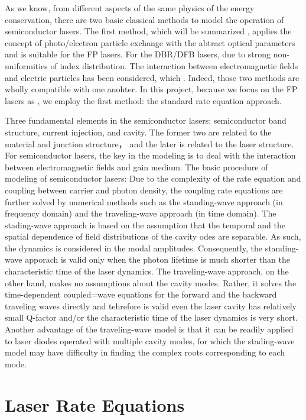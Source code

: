 As we know, from different aspects of the same physics of the energy
conservation, there are two basic classical methods to model the operation of
semiconductor lasers. The first method, which will be summarized , applies the
concept of photo/electron particle exchange with the abtract optical parameters
and is suitable for the FP lasers. For the DBR/DFB lasers, due to strong
non-uniformities of index distribution. The interaction between electromagnetic
fields and electric particles has been considered, which . Indeed, those two
methods are wholly compatible with one anohter. In this project, because we
focus on the FP lasers as , we employ the first method: the standard rate
equation approach.

Three fundamental elements in the semiconductor lasers: semiconductor band
structure, current injection, and cavity. The former two are related to the
material and junction structure， and the later is related to the laser
structure. For semiconductor lasers, the key in the modeling is to deal with
the interaction between electromagnetic fields and gain medium. The basic
procedure of modeling of semiconductor lasers: Due to the complexity of the
rate equation and coupling between carrier and photon density, the coupling
rate equations are further solved by numerical methods such as the
standing-wave approach (in frequency domain) and the traveling-wave approach
(in time domain). The stading-wave approach is based on the assumption that the
temporal and the spatial dependence of field distributions of the cavity odes
are separable. As such, the dynamics is considered in the modal amplitudes.
Consequently, the standing-wave apporach is valid only when the photon lifetime
is much shorter than the characteristic time of the laser dynamics. The
traveling-wave approach, on the other hand, makes no assumptions about the
cavity modes. Rather, it solves the time-dependent coupled=wave equations for
the forward and the backward traveling waves directly and tehrefore is valid
even the laser cavity has relatively small Q-factor and/or the characteristic
time of the laser dynamics is very short. Another advantage of the
traveling-wave model is that it can be readily applied to laser diodes operated
with multiple cavity modes, for which the stading-wave model may have
difficulty in finding the complex roots corresponding to each mode.
\section{Laser Rate Equations} \label{corrections} 


